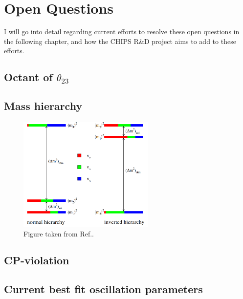 \section{Open Questions}
\label{sec:theory_questions}

I will go into detail regarding current efforts to resolve these open questions in the following
chapter, and how the CHIPS R\&D project aims to add to these efforts.

\subsection{Octant of $\theta_{23}$}


\subsection{Mass hierarchy}

\begin{figure} %
    \includegraphics[origin=c,width=0.6\textwidth]{diagrams/3-theory/hierarchy.png}
    \caption[hierarchy short]
    {Figure taken from Ref.\cite{gouvea2013}.}
    \label{fig:hierarchy}
\end{figure} %


\subsection{CP-violation}


\subsection{Current best fit oscillation parameters}